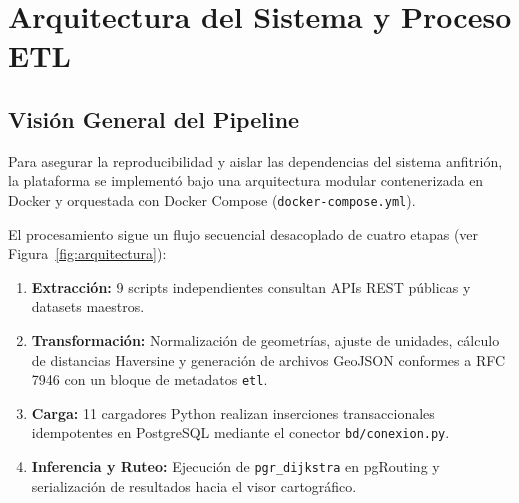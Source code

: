 \documentclass[letterpaper,12pt]{article}
\begin{document}
\section{Arquitectura del Sistema y Proceso ETL}
\label{sec:arquitectura}

\subsection{Visión General del Pipeline}
\label{subsec:arquitectura_vision}

Para asegurar la reproducibilidad y aislar las dependencias del sistema anfitrión, la plataforma se implementó bajo una arquitectura modular contenerizada en Docker y orquestada con Docker Compose (\texttt{docker-compose.yml}).

El procesamiento sigue un flujo secuencial desacoplado de cuatro etapas (ver Figura~\ref{fig:arquitectura}):
\begin{enumerate}
    \item \textbf{Extracción:} 9 scripts independientes consultan APIs REST públicas y datasets maestros.
    \item \textbf{Transformación:} Normalización de geometrías, ajuste de unidades, cálculo de distancias Haversine y generación de archivos GeoJSON conformes a RFC 7946 \cite{rfc7946} con un bloque de metadatos \texttt{etl}.
    \item \textbf{Carga:} 11 cargadores Python realizan inserciones transaccionales idempotentes en PostgreSQL mediante el conector \texttt{bd/conexion.py}.
    \item \textbf{Inferencia y Ruteo:} Ejecución de \texttt{pgr\_dijkstra} en pgRouting \cite{pgrouting} y serialización de resultados hacia el visor cartográfico.
\end{enumerate}
\end{document}
